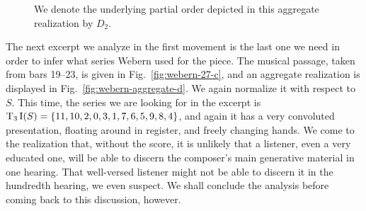 \begin{example}
	\begin{figure}[htbp]
    	\centering
		\caption[An Aggregate Realization of Bars 8--10 in Webern's Op.~27]{We denote the underlying partial order depicted in this aggregate realization by $D_2$.}
    	\label{fig:webern-aggregate-c}
	\end{figure}

	\noindent The next excerpt we analyze in the first movement is the last one we need in order to infer what series Webern used for the piece. The musical passage, taken from bars 19--23, is given in Fig.~\ref{fig:webern-27-c}, and an aggregate realization is displayed in Fig.~\ref{fig:webern-aggregate-d}. We again normalize it with respect to $S$. This time, the series we are looking for in the excerpt is $\operatorname{T}_3\operatorname{I}(S) = \{ 11, 10, 2, 0, 3, 1, 7, 6, 5, 9, 8, 4 \}$, and again it has a very convoluted presentation, floating around in register, and freely changing hands. We come to the realization that, without the score, it is unlikely that a listener, even a very educated one, will be able to discern the composer's main generative material in one hearing. That well-versed listener might not be able to discern it in the hundredth hearing, we even suspect. We shall conclude the analysis before coming back to this discussion, however.


\end{example}
